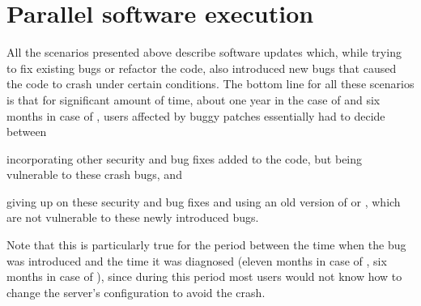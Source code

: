 

\section{Parallel software execution}



All the scenarios presented above describe software updates which, while trying
to fix existing bugs or refactor the code, also introduced new bugs that caused
the code to crash under certain conditions. The bottom line for all these
scenarios is that for significant amount of time, \ie about one year in the
case of \lighttpd and six months in case of \redis, users affected by buggy
patches essentially had to decide between%
\begin{inparaenum}[(1)]
\item incorporating other security and bug fixes added to the code, but being
  vulnerable to these crash bugs, and
\item giving up on these security and bug fixes and using an old version of
  \lighttpd or \redis, which are not vulnerable to these newly introduced bugs.
\end{inparaenum}
Note that this is particularly true for the period between the time when the
bug was introduced and the time it was diagnosed (\ie eleven months in case of
\lighttpd, six months in case of \redis), since during this period most users
would not know how to change the server's configuration to avoid the crash.


